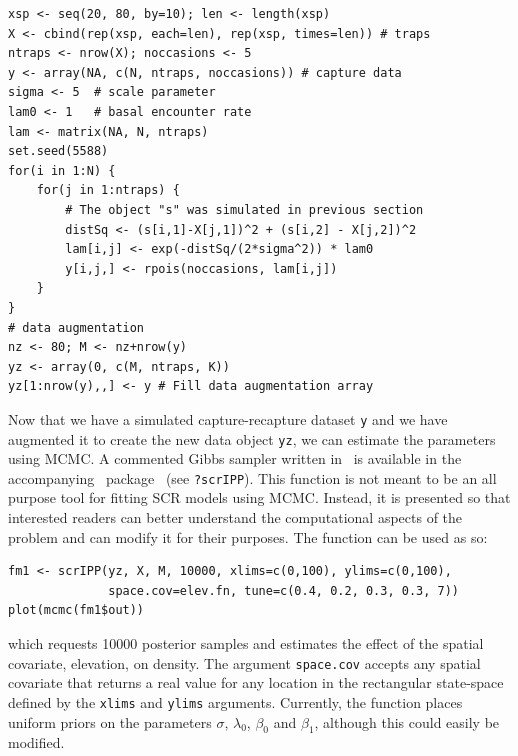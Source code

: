 \begin{samepage}
\begin{small}
\begin{verbatim}
xsp <- seq(20, 80, by=10); len <- length(xsp)
X <- cbind(rep(xsp, each=len), rep(xsp, times=len)) # traps
ntraps <- nrow(X); noccasions <- 5
y <- array(NA, c(N, ntraps, noccasions)) # capture data
sigma <- 5  # scale parameter
lam0 <- 1   # basal encounter rate
lam <- matrix(NA, N, ntraps)
set.seed(5588)
for(i in 1:N) {
    for(j in 1:ntraps) {
        # The object "s" was simulated in previous section
        distSq <- (s[i,1]-X[j,1])^2 + (s[i,2] - X[j,2])^2
        lam[i,j] <- exp(-distSq/(2*sigma^2)) * lam0
        y[i,j,] <- rpois(noccasions, lam[i,j])
    }
}
# data augmentation
nz <- 80; M <- nz+nrow(y)
yz <- array(0, c(M, ntraps, K))
yz[1:nrow(y),,] <- y # Fill data augmentation array
\end{verbatim}
\end{small}
\end{samepage}

Now that we have a simulated capture-recapture dataset \texttt{y} and we have
augmented it to create the new data object \texttt{yz}, we can
estimate the parameters using MCMC.  A commented Gibbs sampler written
in \R~is available in the accompanying \R~package \scrbook~(see
\texttt{?scrIPP}). This function is not meant to be an all purpose
tool for fitting SCR models using MCMC. Instead, it is presented so
that interested readers can better understand the computational
aspects of the problem and can modify it for their purposes.
The function can be used as so:
\begin{small}
\begin{verbatim}
fm1 <- scrIPP(yz, X, M, 10000, xlims=c(0,100), ylims=c(0,100),
              space.cov=elev.fn, tune=c(0.4, 0.2, 0.3, 0.3, 7))
plot(mcmc(fm1$out))
\end{verbatim}
\end{small}
which requests 10000 posterior samples and estimates the effect of the
spatial covariate, elevation, on density.
The argument \verb+space.cov+ accepts any spatial
covariate that returns a real value for any location in the
rectangular state-space defined by the \verb+xlims+ and \verb+ylims+
arguments. Currently, the function
places uniform priors on the parameters $\sigma$, $\lambda_0$,
$\beta_0$ and $\beta_1$, although this could easily be modified.

